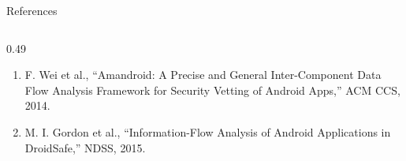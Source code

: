 \documentclass[aspectratio=169,10pt]{beamer}
\begin{document}
\begin{frame}{References}
\begin{columns}[T]
\begin{column}{0.49\textwidth}
\begin{enumerate}
    \item F. Wei et al., ``Amandroid: A Precise and General Inter-Component Data Flow Analysis Framework for Security Vetting of Android Apps,'' ACM CCS, 2014.

    \item M. I. Gordon et al., ``Information-Flow Analysis of Android Applications in DroidSafe,'' NDSS, 2015.

\end{enumerate}

\end{column}

\end{columns}

\end{frame}

\end{document}
